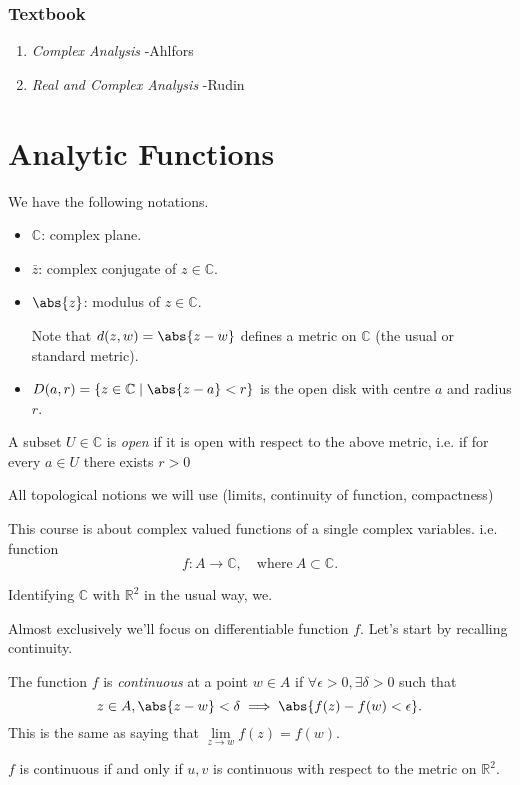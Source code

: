 \subsubsection*{Textbook}
\begin{enumerate}
    \item \textit{Complex Analysis} -Ahlfors
    \item \textit{Real and Complex Analysis} -Rudin
\end{enumerate}
\section{Analytic Functions}
\begin{notation}
    We have the following notations.
    \begin{itemize}
        \item \(\mathbb{C}\): complex plane.
        \item \(\bar{z}\): complex conjugate of \(z \in \mathbb{C}\).
        \item \(\abs{z} \): modulus of \(z \in \mathbb{C}\).

        Note that \(d(z, w) = \abs{z - w} \) defines a metric on \(\mathbb{C}\) (the usual or standard metric).
        \item \(D(a, r) = \{z\in \mathbb{C}\mid \abs{z - a} <r\}\) is the open disk with centre \(a\) and radius \(r\).
    \end{itemize}
\end{notation}
\begin{definition}{}{}
    A subset \(U \in \mathbb{C}\) is \textit{open} if it is open with respect to the above metric, i.e. if for every \(a \in U\) there exists \(r > 0\) 
\end{definition}
All topological notions we will use (limits, continuity of function, compactness)

This course is about complex valued functions of a single complex variables. i.e. function
\[
    f:A\to \mathbb{C},\quad \text{where}~ A\subset \mathbb{C}.
\]
\begin{remark}
    Identifying \(\mathbb{C}\) with \(\mathbb{R}^2\) in the usual way, we.
\end{remark}

Almost exclusively we'll focus on differentiable function \(f\). Let's start by recalling continuity.

\begin{definition}{}{}
    The function \(f\) is \textit{continuous} at a point \(w \in A\) if \(\forall \epsilon > 0, \exists \delta > 0\) such that
    \[
        z \in A, \abs{z - w} <\delta \implies \abs{f(z)-f(w) < \epsilon}.
    \]
    This is the same as saying that \(\lim\limits_{z \to w} f(z)=f(w)\).
\end{definition}
\begin{remark}
    \(f\) is continuous if and only if \(u,v\) is continuous with respect to the metric on \(\mathbb{R}^2\).
\end{remark}

